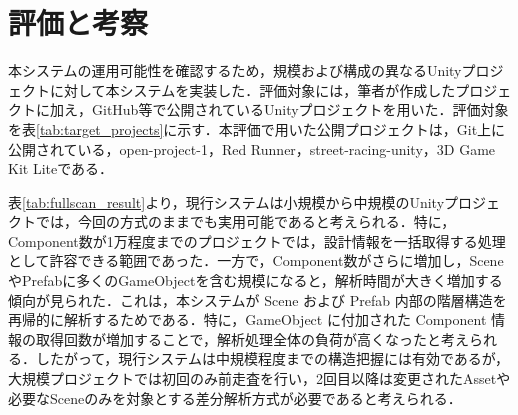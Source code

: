\documentclass[twocolumn,a4paper,dvipdfmx]{ieicejsp}
\begin{document}
\section{評価と考察}
本システムの運用可能性を確認するため，規模および構成の異なるUnityプロジェクトに対して本システムを実装した．評価対象には，筆者が作成したプロジェクトに加え，GitHub等で公開されているUnityプロジェクトを用いた．評価対象を表\ref{tab:target_projects}に示す．本評価で用いた公開プロジェクトは，Git上に公開されている，open-project-1\cite{unity_open_project1}，Red Runner\cite{red_runner}，street-racing-unity\cite{street_racing_unity}，3D Game Kit Lite\cite{unity_3d_gamekit_lite}である．
\begin{table}[hbt] 
  \centering 
  \caption{評価対象プロジェクト} 
  \label{tab:target_projects} 
  \vspace{4pt} 
  \scriptsize 
  \setlength{\tabcolsep}{2.0pt} 
\end{table}

 
表\ref{tab:fullscan_result}より，現行システムは小規模から中規模のUnityプロジェクトでは，今回の方式のままでも実用可能であると考えられる．特に，Component数が1万程度までのプロジェクトでは，設計情報を一括取得する処理として許容できる範囲であった．一方で，Component数がさらに増加し，SceneやPrefabに多くのGameObjectを含む規模になると，解析時間が大きく増加する傾向が見られた．これは，本システムが Scene および Prefab 内部の階層構造を再帰的に解析するためである．特に，GameObject に付加された Component 情報の取得回数が増加することで，解析処理全体の負荷が高くなったと考えられる．したがって，現行システムは中規模程度までの構造把握には有効であるが，大規模プロジェクトでは初回のみ前走査を行い，2回目以降は変更されたAssetや必要なSceneのみを対象とする差分解析方式が必要であると考えられる．
\end{document}
